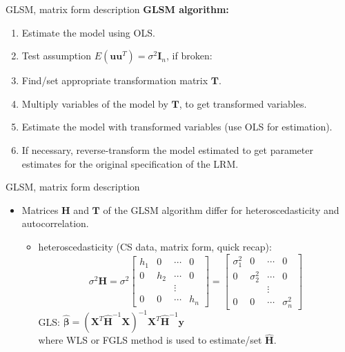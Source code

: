 \documentclass{beamer}
\begin{document}
\begin{frame}{GLSM, matrix form description}
\textbf{GLSM algorithm:} \\ \medskip
\begin{enumerate}
\item Estimate the model using OLS.
\item Test assumption $E(\boldsymbol{uu}^T)=\sigma^2 \boldsymbol{I}_n$, if  broken:
\item Find/set appropriate transformation matrix $\boldsymbol{T}$.
\item Multiply variables of the model by $\boldsymbol{T}$, to get transformed variables.
\item Estimate the model with transformed variables (use OLS for estimation).
\item If necessary, reverse-transform the model estimated to get parameter estimates for the original specification of the LRM.
\end{enumerate}
\end{frame}
\begin{frame}{GLSM, matrix form description}
\begin{itemize}
\item Matrices $\boldsymbol{H}$ and $\boldsymbol{T}$ of the GLSM algorithm differ for heteroscedasticity  and autocorrelation.
\vspace{0.2cm}
\begin{itemize}
\item heteroscedasticity (CS data, matrix form, quick recap):\\
$$\sigma^2 \bm{H} = \sigma^2 
\begin{bmatrix}
    h_1&  0 & \cdots & 0\\
    0 &  h_2&  \cdots & 0\\ 
     &    &  \vdots& \\ 
     0 & 0 & \cdots & h_n 
\end{bmatrix} = 
\begin{bmatrix}
    \sigma^2_1&  0 & \cdots & 0\\
    0 &  \sigma^2_2&  \cdots & 0\\ 
     &    &  \vdots& \\ 
     0 & 0 & \cdots & \sigma^2_n 
\end{bmatrix}
$$
GLS: $\bm{\hat{\beta}}=(\bm{X}^T \bm{\hat{H}}^{-1} \bm{X})^{-1} \bm{X}^T \bm{\hat{H}}^{-1} \bm{y}$\\
where WLS or FGLS method is used to estimate/set $\bm{\hat{H}}$.
\end{itemize}
\end{itemize}
\end{frame}
\end{document}
